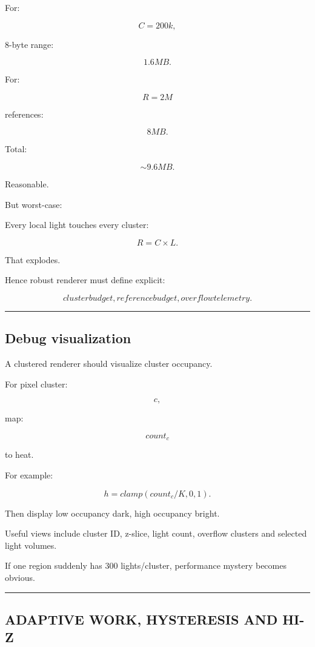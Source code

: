 For:

\[
C=200k,
\]

8-byte range:

\[
1.6MB.
\]

For:

\[
R=2M
\]

references:

\[
8MB.
\]

Total:

\[
\sim9.6MB.
\]

Reasonable.

But worst-case:

Every local light touches every cluster:

\[
R=C\times L.
\]

That explodes.

Hence robust renderer must define explicit:

\[
\boxed{
cluster budget,
reference budget,
overflow telemetry.
}
\]

\begin{center}\rule{0.5\linewidth}{0.5pt}\end{center}

\subsection{Debug visualization}\label{04-visual-computing-ii-ch040-debug-visualization}

A clustered renderer should visualize cluster occupancy.

For pixel cluster:

\[
c,
\]

map:

\[
count_c
\]

to heat.

For example:

\[
h=
clamp(
count_c/K,
0,1
).
\]

Then display low occupancy dark, high occupancy bright.

Useful views include cluster ID, z-slice, light count, overflow clusters and selected light volumes.

If one region suddenly has 300 lights/cluster, performance mystery becomes obvious.

\begin{center}\rule{0.5\linewidth}{0.5pt}\end{center}

\subsection{ADAPTIVE WORK, HYSTERESIS AND HI-Z}\label{04-visual-computing-ii-ch040-adaptive-work-hysteresis-and-hi-z}

